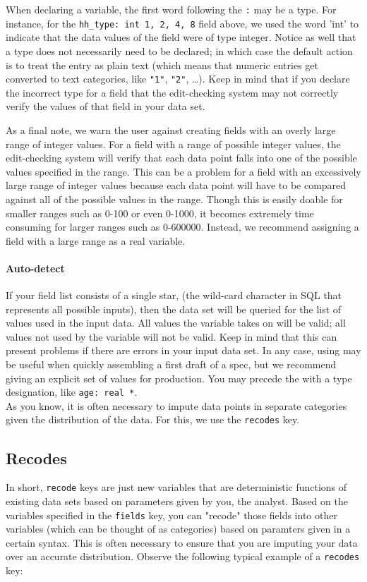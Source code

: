 \documentclass{article}
\begin{document}
When declaring a variable, the first word following the {\tt :} may be a type. For instance, 
for the {\tt hh\_type: int 1, 2, 4, 8} field above, we used the word 'int' to indicate that 
the data values of the field were of type integer. Notice as well that a type does not necessarily 
need to be declared; in which case the default action is to treat the entry as plain text (which means
that numeric entries get converted to text categories, like {\tt "1"}, {\tt "2"}, \dots). Keep in mind 
that if you declare the incorrect type for a field that the edit-checking system may not correctly 
verify the values of that field in your data set.

As a final note, we warn the user against creating fields with an overly large range of integer 
values. For a field with a range of possible integer values, the edit-checking system will verify 
that each data point falls into one of the possible values specified in the range. This can be a 
problem for a field with an excessively large range of integer values because each data point will 
have to be compared against all of the possible values in the range. Though this is easily doable for 
smaller ranges such as 0-100 or even 0-1000, it becomes extremely time consuming for larger ranges such 
as 0-600000. Instead, we recommend assigning a field with a large range as a real variable.

\paragraph{Auto-detect} If your field list consists of a single star, {\tt *} (the wild-card character 
in SQL that represents all possible inputs), then the data set will be queried for the list of values 
used in the input data. All values the variable takes on will be valid; all values not used 
by the variable will not be valid. Keep in mind that this can present problems if there are errors 
in your input data set.
In any case, using {\tt *} may be useful when quickly assembling a first draft of a spec, but we recommend
giving an explicit set of values for production. You may precede the {\tt *}
with a type designation, like {\tt age: real *}.\\


As you know, it is often necessary to impute data points in separate categories given 
the distribution of the data. For this, we use the {\tt recodes} key.

\subsection{Recodes}
In short, {\tt recode} keys are just new variables that are deterministic functions of 
existing data sets based on parameters given by you, the analyst. Based on the variables specified in the 
{\tt fields} key, you can "recode" those fields into other variables (which can be thought of as categories) 
based on paramters given in a certain syntax. This is often necessary to ensure that you are imputing 
your data over an accurate distribution. Observe the following typical example of a {\tt recodes} key:
\end{document}
